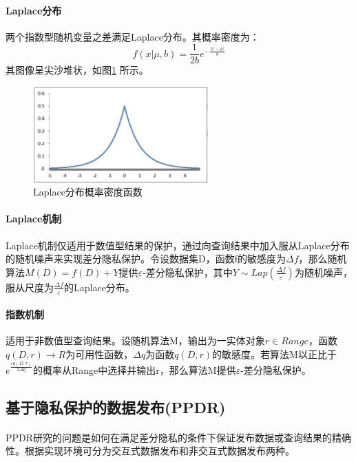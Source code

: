 \documentclass[12pt,a4paper]{article}
\begin{document}
\paragraph{Laplace分布} 两个指数型随机变量之差满足Laplace分布。其概率密度为：
\begin{equation}
	f(x|\mu,b) = \frac{1}{2b}e^{-\frac{|x-\mu|}{b} }
\end{equation}
其图像呈尖沙堆状，如图\ref{laplace-distribution} 所示。
\begin{figure}[H]
	\centering
	\includegraphics[width=0.6\textwidth]{../images/laplace-distribution.png}
	\caption{Laplace分布概率密度函数}
	\label{laplace-distribution}
\end{figure}

\paragraph{Laplace机制} Laplace机制仅适用于数值型结果的保护，通过向查询结果中加入服从Laplace分布的随机噪声来实现差分隐私保护。令设数据集D，函数f的敏感度为$\Delta f$，那么随机算法$M(D)=f(D)+Y$提供$\varepsilon$-差分隐私保护，其中$Y \sim Lap(\frac{\Delta f}{\varepsilon})$为随机噪声，服从尺度为$\frac{\Delta f}{\varepsilon}$的Laplace分布。

\paragraph{指数机制} 适用于非数值型查询结果。设随机算法M，输出为一实体对象$r \in Range$，函数$q(D,r)\rightarrow R $为可用性函数，$\Delta q$为函数$q(D,r)$的敏感度。若算法M以正比于$e^{\frac{\varepsilon q(D,r)}{2\Delta q}}$的概率从Range中选择并输出r，那么算法M提供$\varepsilon$-差分隐私保护。

\subsection{基于隐私保护的数据发布(PPDR)}
\paragraph{} PPDR研究的问题是如何在满足差分隐私的条件下保证发布数据或查询结果的精确性。根据实现环境可分为交互式数据发布和非交互式数据发布两种。
\end{document}
